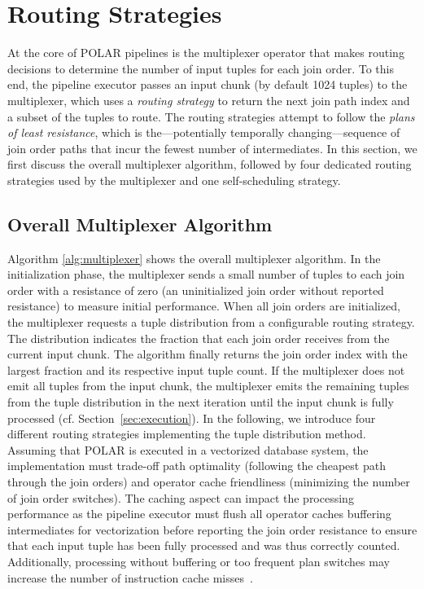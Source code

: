 

\section{Routing Strategies}
\label{sec:routing_strategies}

At the core of POLAR pipelines is the multiplexer operator that makes routing decisions to determine the number of input tuples for each join order. To this end, the pipeline executor passes an input chunk (by default 1024 tuples) to the multiplexer, which uses a \emph{routing strategy} to return the next join path index and a subset of the tuples to route. The routing strategies attempt to follow the \emph{plans of least resistance}, which is the---potentially temporally changing---sequence of join order paths that incur the fewest number of intermediates. In this section, we first discuss the overall multiplexer algorithm, followed by four dedicated routing strategies used by the multiplexer and one self-scheduling strategy.

\subsection{Overall Multiplexer Algorithm}

Algorithm \ref{alg:multiplexer} shows the overall multiplexer algorithm. In the initialization phase, the multiplexer sends a small number of tuples to each join order with a resistance of zero (\ie an uninitialized join order without reported resistance) to measure initial performance. When all join orders are initialized, the multiplexer requests a tuple distribution from a configurable routing strategy. The distribution indicates the fraction that each join order receives from the current input chunk. The algorithm finally returns the join order index with the largest fraction and its respective input tuple count. If the multiplexer does not emit all tuples from the input chunk, the multiplexer emits the remaining tuples from the tuple distribution in the next iteration until the input chunk is fully processed (cf. Section~\ref{sec:execution}).
%
In the following, we introduce four different routing strategies implementing the tuple distribution method. Assuming that POLAR is executed in a vectorized database system, the implementation must trade-off path optimality (following the cheapest path through the join orders) and operator cache friendliness (minimizing the number of join order switches). The caching aspect can impact the processing performance as the pipeline executor must flush all operator caches buffering intermediates for vectorization before reporting the join order resistance to ensure that each input tuple has been fully processed and was thus correctly counted. Additionally, processing without buffering or too frequent plan switches may increase the number of instruction cache misses~\cite{SirinTPA16}. 

